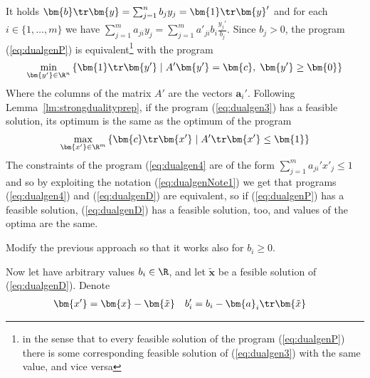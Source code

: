 \noindent
It holds $\bm{b}\tr\bm{y}=\sum_{j=1}^nb_jy_j=\bm{1}\tr\bm{y}'$ and for each $i\in\{1,\ldots,m\}$ we have
$\sum_{j=1}^ma_{ji}y_j=\sum_{j=1}^ma'_{ji}b_i\frac{y_j'}{b_j}$. Since  $b_j>0$,  the program (\ref{eq:dualgenP})
is equivalent\footnote{in the sense that to every feasible solution of the program (\ref{eq:dualgenP}) 
there is some corresponding feasible solution of (\ref{eq:dualgen3}) with the same value, and vice versa} with
the program
\begin{equation}
  \label{eq:dualgen3}
  \min_{\bm{y'}\in\R^n}\left\{ \bm{1}\tr\bm{y'} \mid A'\bm{y'}=\bm{c},\;\bm{y'}\ge\bm{0}\right\} 
\end{equation}
Where the columns of the matrix $A'$ are the vectors $\bm{a}_i'$.
Following Lemma~\ref{lm:strongdualityprep}, if the program (\ref{eq:dualgen3}) has a feasible solution,
its optimum is the same as the optimum of the program
\begin{equation}
  \label{eq:dualgen4}
  \max_{\bm{x'}\in\R^m}\left\{ \bm{c}\tr\bm{x'}\mid {A'}\tr\bm{x'}\le\bm{1}\right\}
 \end{equation}
 The constraints of the program (\ref{eq:dualgen4} are of the form $\sum_{j=1}^ma_{ji}'x'_j\le1$
 and so by exploiting the notation  (\ref{eq:dualgenNote1}) we get that programs
 (\ref{eq:dualgen4}) and (\ref{eq:dualgenD}) are equivalent, so if (\ref{eq:dualgenP})
 has a feasible solution,  (\ref{eq:dualgenD}) has a feasible solution, too, and values of the optima
 are the same.


\begin{prob}
  Modify the previous approach so that it works also for $b_i\ge0$.
\end{prob}

\noindent
Now let  have arbitrary values $b_i\in\R$, and  let $\bm{\tilde{x}}$ be a fesible solution of 
(\ref{eq:dualgenD}). Denote
\begin{align}
  \label{eq:dualgen5}
  \bm{x'}&=\bm{x}-\bm{\tilde{x}} & b_i'&=b_i-\bm{a}_i\tr\bm{\tilde{x}}
\end{align}

